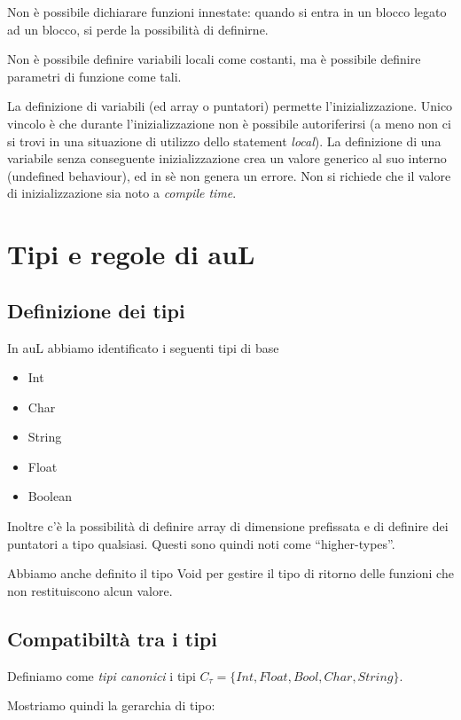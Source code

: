 \documentclass{article}
\begin{document}
Non è possibile dichiarare funzioni innestate: quando si entra in un blocco legato ad un blocco, si perde
la possibilità di definirne.

Non è possibile definire variabili locali come costanti, ma è possibile definire parametri di funzione
come tali. 

La definizione di variabili (ed array o puntatori) permette l'inizializzazione. Unico vincolo è che durante l'inizializzazione
non è possibile autoriferirsi (a meno non ci si trovi in una situazione di utilizzo dello
statement \textit{local}). La definizione di una variabile senza conseguente inizializzazione crea un valore
generico al suo interno (undefined behaviour), ed in sè non genera un errore. Non si richiede che il valore di 
inizializzazione sia noto a \textit{compile time}.

\section{Tipi e regole di auL}
\subsection{Definizione dei tipi}
In auL abbiamo identificato i seguenti tipi di base
\begin{itemize}
    \item Int
    \item Char
    \item String
    \item Float
    \item Boolean
\end{itemize}
Inoltre c'è la possibilità di definire array di dimensione prefissata e di definire dei puntatori a tipo qualsiasi. Questi sono quindi noti come
``higher-types''.

Abbiamo anche definito il tipo Void per gestire il tipo di ritorno delle funzioni che non restituiscono alcun valore.
\subsection{Compatibiltà tra i tipi}
Definiamo come \emph{tipi canonici} i tipi $C_\tau=\{Int, Float, Bool, Char, String\}$.


Mostriamo quindi la gerarchia di tipo:\\
~\\
~\\
\end{document}
